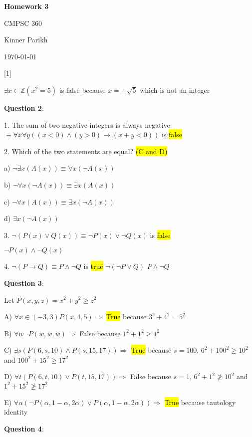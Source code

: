 \documentclass{article} %
\newcommand{\question}[2][]{\begin{flushleft}
        \textbf{Question #1}: \textit{#2}

\end{flushleft}}
\newcommand{\maketitletwo}[2][]{\begin{center}
        \Large{\textbf{Homework #1}
            
            CMPSC 360} %
        \vspace{5pt}
        
        \normalsize{Kinner Parikh  %
        
        \today}        %
        \vspace{15pt}
        
\end{center}}
\begin{document}
    \maketitletwo[3]  %
    
    \question[1]{}

    $\exists x \in \mathbb{Z}(x ^ 2 = 5)$ is false because $x = \pm \sqrt{5}$ which is not an integer

    \question[2]{}

    1. The sum of two negative integers is always negative $\equiv \forall x \forall y((x < 0) \land (y > 0) \rightarrow (x + y < 0 ))$ \tabto{0.98cm} is \hl{false}

    \hspace{0cm}

    2. Which of the two statements are equal? \hl{(C and D)}

    \tabto{0.98cm}a) $\neg \exists x(A(x)) \equiv \forall x(\neg A(x))$

    \tabto{0.98cm}b) $\neg \forall x(\neg A(x)) \equiv \exists x(A(x))$

    \tabto{0.98cm}c) $\neg \forall x(A(x)) \equiv \exists x(\neg A(x))$

    \tabto{0.98cm}d) $\exists x(\neg A(x))$

    \hspace{0cm}

    3. $\neg (P(x) \lor Q(x)) \equiv \neg P(x) \lor \neg Q(x)$ is \hl{false}

    \tabto{0.98cm} $\neg P(x) \land \neg Q(x)$

    \hspace{0cm}

    4. $\neg (P \rightarrow Q) \equiv P \land \neg Q$ is \hl{true}
    \tabto{0.98cm} $\neg (\neg P \lor Q)$
    \tabto{0.98cm} $P \land \neg Q$

    \question[3]{}

    Let $P(x, y, z) = x^2 + y^2 \ge z^2$

    A) $\forall x \in (-3, 3) P(x, 4, 5) \Rightarrow$ \hl{True} because $3^2 + 4^2 = 5^2$

    B) $\forall w \neg P(w, w, w) \Rightarrow$ False because $1^2 + 1^2 \geq 1^2$

    C) $\exists s (P(6, s, 10) \land P(s, 15, 17)) \Rightarrow$ \hl{True} because $s = 100$, $6^2 + 100^2 \ge 10^2$ and $100^2 + 15^2 \ge 17^2$

    D) $\forall t (P(6, t, 10) \lor P(t, 15, 17)) \Rightarrow$ False because $s = 1$, $6^2 + 1^2 \ngeq 10^2$ and $1^2 + 15^2 \ngeq 17^2$

    E) $\forall \alpha (\neg P(\alpha, 1 - \alpha, 2 \alpha) \lor P(\alpha, 1-\alpha, 2\alpha)) \Rightarrow$ \hl{True} because tautology identity

    \question[4]{}

    
    
\end{document}

